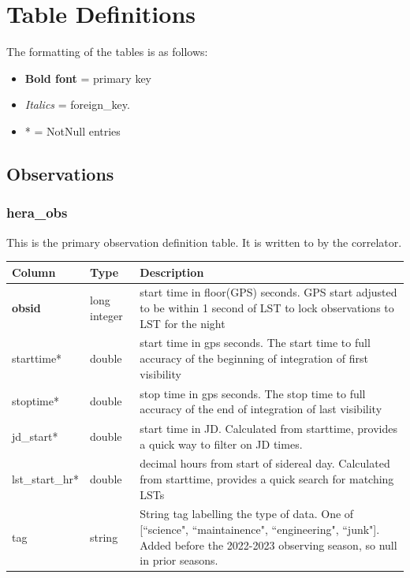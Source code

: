 \documentclass{article}
\begin{document}
{%
\newpage

\section{Table Definitions}
\label{sec:tables}

\vspace{5mm}
\etocsettocstyle{}{}
\localtableofcontents
\newpage

The formatting of the tables is as follows:
\begin{itemize}\setlength\itemsep{-.3em}
	\item {\bf Bold font} = primary key
	\item {\em Italics} = foreign\_key.
	\item * = NotNull entries
\end{itemize}


\subsection{Observations}
\subsubsection{hera\_obs}
This is the primary observation definition table. It is written to by the correlator.

\begin{center}
 \begin{tabular}{| p{4cm} | p{2cm} | p{10cm} |}
 \hline
 {\bf Column} & {\bf Type}  & {\bf Description} \\ [0.5ex]  \hline\hline
 \textbf{obsid} & long integer & start time in floor(GPS) seconds. GPS start adjusted to be within 1 second of LST to lock observations to LST for the night \\ \hline
 starttime* & double & start time in gps seconds. The start time to full accuracy of the beginning of integration of first visibility \\\hline
 stoptime* & double & stop time in gps seconds. The stop time to full accuracy of the end of integration of last visibility \\\hline
 jd\_start* & double & start time in JD. Calculated from starttime, provides a quick way to filter on JD times. \\\hline
 lst\_start\_hr* & double & decimal hours from start of sidereal day. Calculated from starttime, provides a quick search for matching LSTs \\\hline
 tag & string & String tag labelling the type of data. One of [``science", ``maintainence", ``engineering", ``junk"]. Added before the 2022-2023 observing season, so null in prior seasons. \\\hline
 \end{tabular}
\end{center}

}
\end{document}

